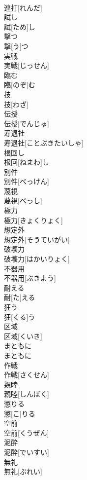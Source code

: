 \documentclass[8pt]{extreport}
\begin{document}
\begin{CJK}{UTF8}{min}
\\	連打[れんだ]	
\\	試し	
\\	試[ため]し	
\\	撃つ	
\\	撃[う]つ	
\\	実戦	
\\	実戦[じっせん]	
\\	臨む	
\\	臨[のぞ]む	
\\	技	
\\	技[わざ]	
\\	伝授	
\\	伝授[でんじゅ]	
\\	寿退社	
\\	寿退社[ことぶきたいしゃ]	
\\	根回し	
\\	根回[ねまわ]し	
\\	別件	
\\	別件[べっけん]	
\\	蔑視	
\\	蔑視[べっし]	
\\	極力	
\\	極力[きょくりょく]	
\\	想定外	
\\	想定外[そうていがい]	
\\	破壊力	
\\	破壊力[はかいりょく]	
\\	不器用	
\\	不器用[ぶきよう]	
\\	耐える	
\\	耐[た]える	
\\	狂う	
\\	狂[くる]う	
\\	区域	
\\	区域[くいき]	
\\	まともに	
\\	まともに	
\\	作戦	
\\	作戦[さくせん]	
\\	親睦	
\\	親睦[しんぼく]	
\\	懲りる	
\\	懲[こ]りる	
\\	空前	
\\	空前[くうぜん]	
\\	泥酔	
\\	泥酔[でいすい]	
\\	無礼	
\\	無礼[ぶれい]	

\end{CJK}
\end{document}
